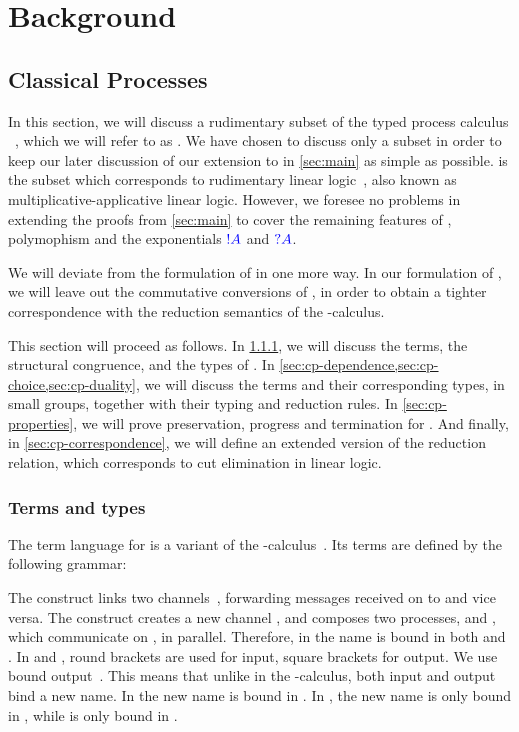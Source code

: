 \chapter{Background}\label{sec:background}
\section{Classical Processes}\label{sec:cp}
In this section, we will discuss a rudimentary subset of the typed process
calculus \cp~\cite{wadler2012,lindley2015semantics}, which we will refer to as
\rcp. 
We have chosen to discuss only a subset in order to keep our later discussion of
our extension to \cp in \cref{sec:main} as simple as possible.
\rcp is the subset which corresponds to rudimentary linear
logic~\cite[RLL]{girard1992}, also known as multiplicative-applicative linear
logic. 
However, we foresee no problems in extending the proofs from \cref{sec:main} to
cover the remaining features of \cp, polymophism and the exponentials $\textcolor{blue}{!A}$
and $\textcolor{blue}{?A}$. 

We will deviate from the formulation of \cp in one more way. In our formulation
of \rcp, we will leave out the commutative conversions of \cp, in order to
obtain a tighter correspondence with the reduction semantics of the
\textpi-calculus.

This section will proceed as follows.
In \cref{sec:cp-terms-and-types}, we will discuss the terms, the structural
congruence, and the types of \rcp. 
In \cref{sec:cp-dependence,sec:cp-choice,sec:cp-duality}, we will discuss the
terms and their corresponding types, in small groups, together with their typing
and reduction rules. 
In \cref{sec:cp-properties}, we will prove preservation, progress and
termination for \rcp.
And finally, in \cref{sec:cp-correspondence}, we will define an extended version
of the reduction relation, which corresponds to cut elimination in linear logic.

\subsection{Terms and types}\label{sec:cp-terms-and-types}
The term language for \rcp is a variant of the
\textpi-calculus~\cite{milner1992b}.
Its terms are defined by the following grammar:

The construct  links two
channels~\cite{sangiorgi1996,boreale1998}, forwarding messages received on
 to  and vice versa.
The construct  creates a new channel , and composes
two processes,  and , which communicate on , in parallel.
Therefore, in  the name  is bound in both  and
.
In  and , round brackets are used
for input, square brackets for output.
We use bound output~\cite{sangiorgi1996}.
This means that unlike in the \textpi-calculus, both input and output bind a new
name.
In  the new name  is bound in .
In , the new name  is only bound in , while
 is only bound in .

